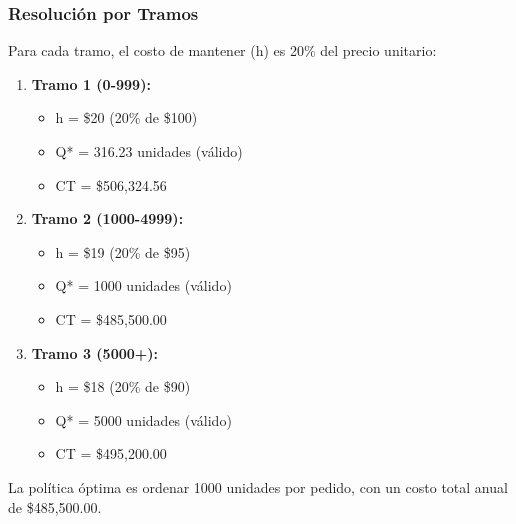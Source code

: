 \documentclass[11pt,a4paper]{article}
\begin{document}
\subsubsection{Resolución por Tramos}
Para cada tramo, el costo de mantener (h) es 20\% del precio unitario:
\begin{enumerate}
    \item \textbf{Tramo 1 (0-999):}
        \begin{itemize}
            \item h = \$20 (20\% de \$100)
            \item Q* = 316.23 unidades (válido)
            \item CT = \$506,324.56
        \end{itemize}
    
    \item \textbf{Tramo 2 (1000-4999):}
        \begin{itemize}
            \item h = \$19 (20\% de \$95)
            \item Q* = 1000 unidades (válido)
            \item CT = \$485,500.00
        \end{itemize}
    
    \item \textbf{Tramo 3 (5000+):}
        \begin{itemize}
            \item h = \$18 (20\% de \$90)
            \item Q* = 5000 unidades (válido)
            \item CT = \$495,200.00
        \end{itemize}
\end{enumerate}

La política óptima es ordenar 1000 unidades por pedido, con un costo total anual de \$485,500.00.
\end{document}
